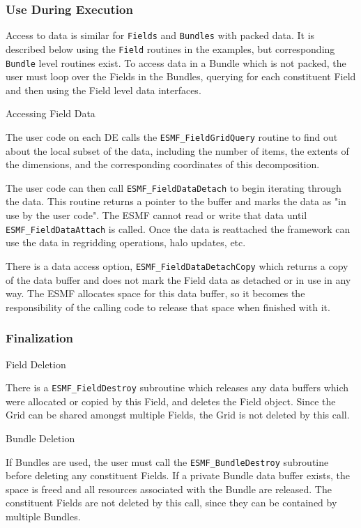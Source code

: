 \subsubsection{Use During Execution}

Access to data is similar for {\tt Fields} and {\tt Bundles} with
packed data.  It is described below using the {\tt Field}
routines in the examples, but corresponding {\tt Bundle} level
routines exist.  To access data in a
Bundle which is not packed, the user must loop over the
Fields in the Bundles, querying for each
constituent Field and then using the Field level data interfaces.

\begin{description}

\item{Accessing Field Data}

The user code on each DE calls the {\tt ESMF\_FieldGridQuery}
routine to find out about the local subset of the data, including
the number of items, the extents
of the dimensions, and the corresponding coordinates of this
decomposition.

The user code can then call {\tt ESMF\_FieldDataDetach} to
begin iterating through the data.  This routine returns a
pointer to the buffer and marks the data as "in use by
the user code".  The ESMF cannot read or write that
data until {\tt ESMF\_FieldDataAttach} is called.  Once the data
is reattached the framework can use the data in regridding 
operations, halo updates, etc.  

There is a data access option, {\tt ESMF\_FieldDataDetachCopy}
which returns a copy of the data buffer and does not mark the
Field data as detached or in use in any way.  The ESMF 
allocates space for this data buffer, so it becomes the
responsibility of the calling code to release that space 
when finished with it.

\end{description}

\subsubsection{Finalization}

\begin{description}

\item{Field Deletion}

There is a {\tt ESMF\_FieldDestroy} subroutine which releases
any data buffers which were allocated or copied by this Field,
and deletes the Field object.  Since the Grid can be shared
amongst multiple Fields, the Grid is not deleted by this call.

\item{Bundle Deletion}

If Bundles are used, the user must call the 
{\tt ESMF\_BundleDestroy} subroutine before deleting any constituent
Fields.  If a private Bundle data buffer exists, the space is
freed and all resources associated with the Bundle are released.
The constituent Fields are not deleted by this call, since they
can be contained by multiple Bundles.

\end{description}




